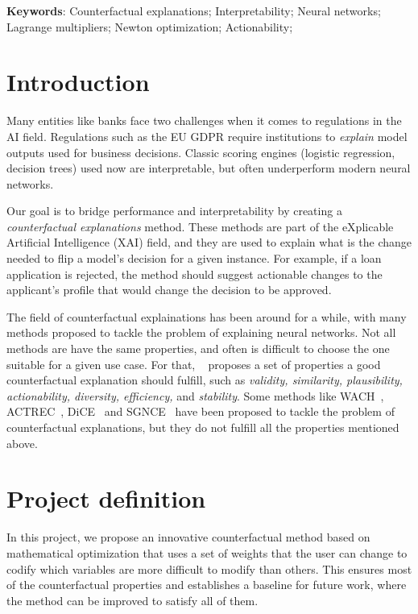 \documentclass[12pt]{extarticle}
\numberwithin{equation}{section}
\begin{document}
\textbf{Keywords}: Counterfactual explanations; Interpretability; Neural networks; Lagrange multipliers; Newton optimization; Actionability; 

\section*{Introduction}
Many entities like banks face two challenges when it comes to regulations in the AI field. Regulations such as the EU GDPR require institutions to \emph{explain} model outputs used for business decisions. Classic scoring engines (logistic regression, decision trees) used now are interpretable, but often underperform modern neural networks.

Our goal is to bridge performance and interpretability by creating a \emph{counterfactual explanations} method. These methods are part of the eXplicable Artificial Intelligence (XAI) field, and they are used to explain what is the change needed to flip a model's decision for a given instance. For example, if a loan application is rejected, the method should suggest actionable changes to the applicant's profile that would change the decision to be approved. 

The field of counterfactual explainations has been around for a while, with many methods proposed to tackle the problem of explaining neural networks. Not all methods are have the same properties, and often is difficult to choose the one suitable for a given use case. For that, ~\cite{guidotti2024counterfactual_res} proposes a set of properties a good counterfactual explanation should fulfill, such as \emph{validity, similarity, plausibility, actionability, diversity, efficiency,} and \emph{stability}. Some methods like WACH~\cite{wachter2017counterfactual_res}, ACTREC~\cite{ustun2019actionable_res}, DiCE~\cite{dice_res} and SGNCE~\cite{sgnce_res} have been proposed to tackle the problem of counterfactual explanations, but they do not fulfill all the properties mentioned above. 

\section*{Project definition}
In this project, we propose an innovative counterfactual method based on mathematical optimization that uses a set of weights that the user can change to codify which variables are more difficult to modify than others. This ensures most of the counterfactual properties and establishes a baseline for future work, where the method can be improved to satisfy all of them. 
\end{document}

